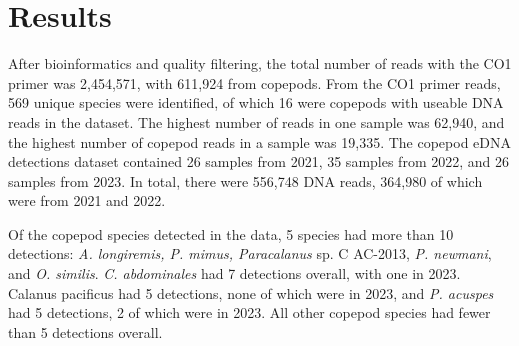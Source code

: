 \documentclass[12pt,twoside]{reedthesis}
\begin{document}
{	\chapter{Results}
	
	
	After bioinformatics and quality filtering, the total number of reads with the CO1 primer was 2,454,571, with 611,924 from copepods. From the CO1 primer reads, 569 unique species were identified, of which 16 were copepods with useable DNA reads in the dataset. The highest number of reads in one sample was 62,940, and the highest number of copepod reads in a sample was 19,335. The copepod eDNA detections dataset contained 26 samples from 2021, 35 samples from 2022, and 26 samples from 2023. In total, there were 556,748 DNA reads, 364,980 of which were from 2021 and 2022. 
	
	Of the copepod species detected in the data, 5 species had more than 10 detections: \textit{A. longiremis, P. mimus, Paracalanus} sp. C AC-2013, \textit{P. newmani}, and \textit{O. similis}. \textit{C. abdominales} had 7 detections overall, with one in 2023. Calanus pacificus had 5 detections, none of which were in 2023, and \textit{P. acuspes} had 5 detections, 2 of which were in 2023. All other copepod species had fewer than 5 detections overall.
	
	
	
	
}
\end{document}
